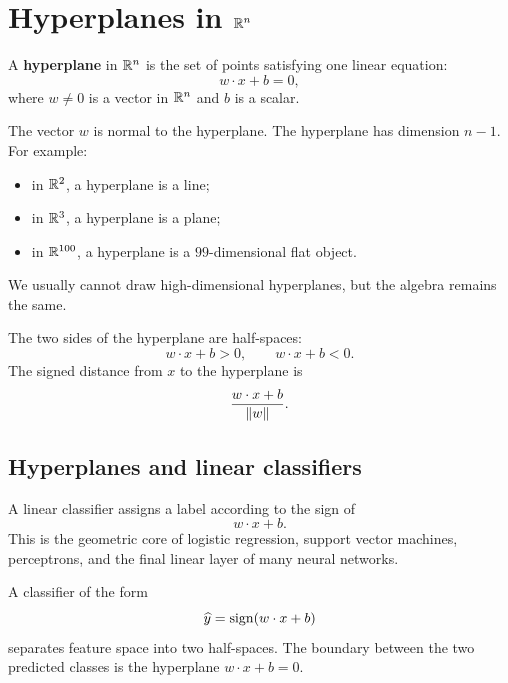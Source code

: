 \section{Hyperplanes in $\mathbb{R}^n$}

A \textbf{hyperplane} in $\mathbb{R}^n$ is the set of points satisfying one linear equation:
\[
  w\cdot x+b=0,
\]
where $w\ne 0$ is a vector in $\mathbb{R}^n$ and $b$ is a scalar.

The vector $w$ is normal to the hyperplane. The hyperplane has dimension $n-1$. For example:
\begin{itemize}
\item in $\mathbb{R}^2$, a hyperplane is a line;
\item in $\mathbb{R}^3$, a hyperplane is a plane;
\item in $\mathbb{R}^{100}$, a hyperplane is a $99$-dimensional flat object.
\end{itemize}
We usually cannot draw high-dimensional hyperplanes, but the algebra remains the same.

The two sides of the hyperplane are half-spaces:
\[
  w\cdot x+b>0,\qquad w\cdot x+b<0.
\]
The signed distance from $x$ to the hyperplane is
\[
  \frac{w\cdot x+b}{\left\lVert w\right\rVert}.
\]

\subsection{Hyperplanes and linear classifiers}

A linear classifier assigns a label according to the sign of
\[
  w\cdot x+b.
\]
This is the geometric core of logistic regression, support vector machines, perceptrons, and the final linear layer of many neural networks.

\begin{bridgebox}[title={Hyperplane as a decision boundary}]
A classifier of the form
\[
  \widehat y=\operatorname{sign}(w\cdot x+b)
\]
separates feature space into two half-spaces. The boundary between the two predicted classes is the hyperplane $w\cdot x+b=0$.
\end{bridgebox}


